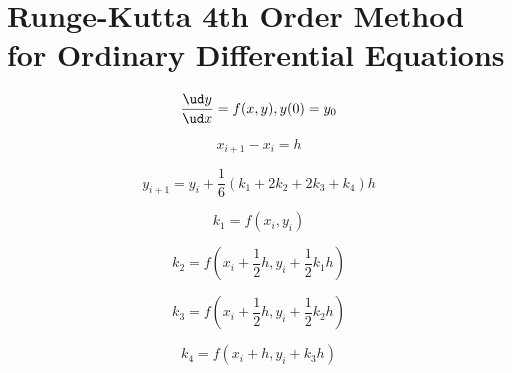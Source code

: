 \section{Runge-Kutta 4th Order Method for Ordinary Differential Equations}

\[\frac{\ud y}{\ud x} = f(x, y), y(0) = y_0\]

\[x_{i + 1} - x_i = h\]

\[y_{i + 1} = y_i + \frac{1}{6}(k_1 + 2 k_2 + 2 k_3 + k_4) h\]

\[k_1 = f(x_i, y_i)\]

\[k_2 = f(x_i + \frac{1}{2} h, y_i + \frac{1}{2} k_1 h)\]

\[k_3 = f(x_i + \frac{1}{2} h, y_i + \frac{1}{2} k_2 h)\]

\[k_4 = f(x_i + h, y_i + k_3 h)\]
